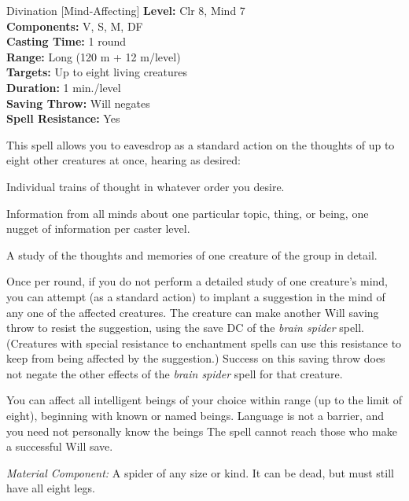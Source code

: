 {Divination [Mind-Affecting]}
{
	\textbf{Level:} Clr 8, Mind 7\\
	\textbf{Components:} V, S, M, DF\\
	\textbf{Casting Time:} 1 round\\
	\textbf{Range:} Long (120 m + 12 m/level)\\
	\textbf{Targets:} Up to eight living creatures\\
	\textbf{Duration:} 1 min./level\\
	\textbf{Saving Throw:} Will negates\\
	\textbf{Spell Resistance:} Yes\\
}
{
	This spell allows you to eavesdrop as a standard action on the thoughts of up to eight other creatures at once, hearing as desired:
	\begin{itemize*}
		\item Individual trains of thought in whatever order you desire.
		\item Information from all minds about one particular topic, thing, or being, one nugget of information per caster level.
		\item A study of the thoughts and memories of one creature of the group in detail.
	\end{itemize*}

	Once per round, if you do not perform a detailed study of one creature's mind, you can attempt (as a standard action) to implant a suggestion in the mind of any one of the affected creatures. The creature can make another Will saving throw to resist the suggestion, using the save DC of the \emph{brain spider} spell. (Creatures with special resistance to enchantment spells can use this resistance to keep from being affected by the suggestion.) Success on this saving throw does not negate the other effects of the \emph{brain spider} spell for that creature.

	You can affect all intelligent beings of your choice within range (up to the limit of eight), beginning with known or named beings. Language is not a barrier, and you need not personally know the beings The spell cannot reach those who make a successful Will save.

	\textit{Material Component:} A spider of any size or kind. It can be dead, but must still have all eight legs.
}